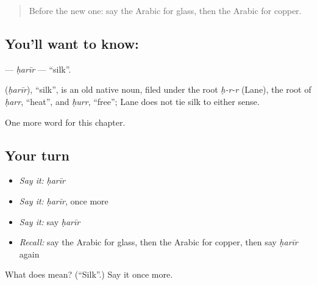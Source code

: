 \label{lesson:AR-C219-harir}



\begin{quote}
Before the new one: say the Arabic for glass, then the Arabic for copper.
\end{quote}

\subsection*{You'll want to know: }
\textbf{} — \emph{ḥarīr} — \textquotedblleft{}silk\textquotedblright{}.

\begin{cousinweb}
\textbf{} (\emph{ḥarīr}), \textquotedblleft{}silk\textquotedblright{}, is an old native noun, filed under the root \emph{ḥ-r-r} (Lane), the root of \emph{ḥarr}, \textquotedblleft{}heat\textquotedblright{}, and \emph{ḥurr}, \textquotedblleft{}free\textquotedblright{}; Lane does not tie silk to either sense.
\end{cousinweb}

\begin{grammarlens}[title={What you've built}]
One more word for this chapter.
\end{grammarlens}

\subsection*{Your turn}
\begin{itemize}
\raggedright
  \item \emph{Say it:} \emph{ḥarīr}
  \item \emph{Say it:} \emph{ḥarīr}, once more
  \item \emph{Say it:} say \emph{ḥarīr}
  \item \emph{Recall:} say the Arabic for glass, then the Arabic for copper, then say \emph{ḥarīr} again
\end{itemize}

\begin{tcolorbox}[breakable,colback=teal!4,colframe=teal!35!black,title={Before you move on}]
What does  mean? (\textquotedblleft{}Silk\textquotedblright{}.) Say it once more.
\end{tcolorbox}
